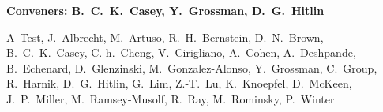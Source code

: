 

\begin{center}

\begin{large} {\bf Conveners: B.~C.~K.~Casey, Y.~Grossman, D.~G.~Hitlin} \end{large}

A~Test,
J.~Albrecht,
M.~Artuso,
R.~H.~Bernstein,
D.~N.~Brown,
B.~C.~K.~Casey,
C.-h.~Cheng,
V.~Cirigliano,
A.~Cohen,
A.~Deshpande,
B.~Echenard,
D.~Glenzinski,
M.~Gonzalez-Alonso,
Y.~Grossman,
C.~Group,
R.~Harnik,
D.~G.~Hitlin, 
G.~Lim,
Z.-T.~Lu,
K.~Knoepfel,
D.~McKeen,
J.~P.~Miller,
M.~Ramsey-Musolf,
R.~Ray,
M.~Rominsky,
P.~Winter 


\end{center}

